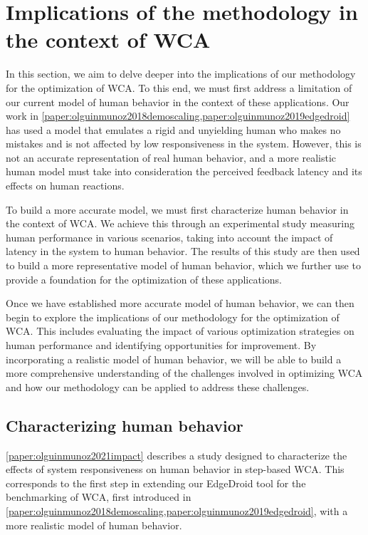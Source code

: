 \section{Implications of the methodology in the context of \acs{WCA}}\label{sec:extendingmethodology}

In this section, we aim to delve deeper into the implications of our methodology for the optimization of \gls{WCA}.
To this end, we must first address a limitation of our current model of human behavior in the context of these applications.
Our work in \cref{paper:olguinmunoz2018demoscaling,paper:olguinmunoz2019edgedroid} has used a model that emulates a rigid and unyielding human who makes no mistakes and is not affected by low responsiveness in the system.
However, this is not an accurate representation of real human behavior, and a more realistic human model must take into consideration the perceived feedback latency and its effects on human reactions.

To build a more accurate model, we must first characterize human behavior in the context of \gls{WCA}.
We achieve this through an experimental study measuring human performance in various scenarios, taking into account the impact of latency in the system to human behavior.
The results of this study are then used to build a more representative model of human behavior, which we further use to provide a foundation for the optimization of these applications.

Once we have established more accurate model of human behavior, we can then begin to explore the implications of our methodology for the optimization of \gls{WCA}.
This includes evaluating the impact of various optimization strategies on human performance and identifying opportunities for improvement.
By incorporating a realistic model of human behavior, we will be able to build a more comprehensive understanding of the challenges involved in optimizing \gls{WCA} and how our methodology can be applied to address these challenges.

\subsection{Characterizing human behavior}

\cref{paper:olguinmunoz2021impact} describes a study designed to characterize the effects of system responsiveness on human behavior in step-based \gls{WCA}.
This corresponds to the first step in extending our EdgeDroid tool for the benchmarking of \gls{WCA}, first introduced in \cref{paper:olguinmunoz2018demoscaling,paper:olguinmunoz2019edgedroid}, with a more realistic model of human behavior.

